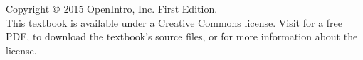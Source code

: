 \chapter*{}
\vfill

\noindent Copyright $\copyright$ 2015 OpenIntro, Inc. First Edition. \\

\noindent This textbook is available under a Creative Commons license. %
Visit  for a free PDF, to download the textbook's source files, or for more information about the license. \\


